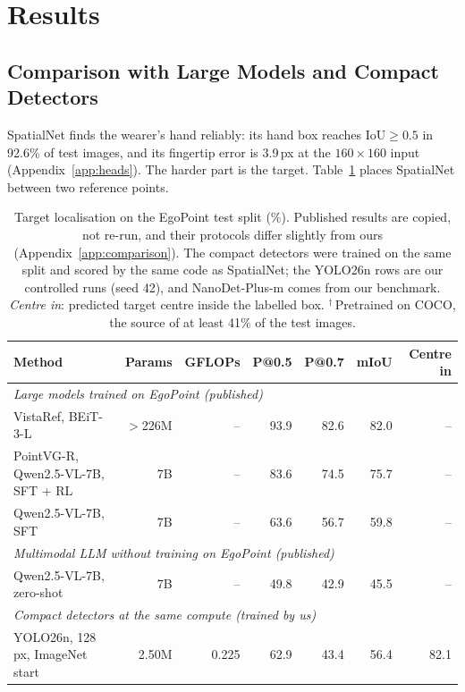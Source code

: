 \section{Results}\label{sec:results}

\subsection{Comparison with Large Models and Compact Detectors}\label{sec:comparison}

SpatialNet finds the wearer's hand reliably: its hand box reaches IoU${\geq}0.5$ in 92.6\% of test images, and its fingertip error is 3.9\,px at the $160\times160$ input (Appendix~\ref{app:heads}). The harder part is the target. Table~\ref{tab:main} places SpatialNet between two reference points.

\begin{table}[t]
  \caption{Target localisation on the EgoPoint test split (\%). Published results are copied, not re-run, and their protocols differ slightly from ours (Appendix~\ref{app:comparison}). The compact detectors were trained on the same split and scored by the same code as SpatialNet; the YOLO26n rows are our controlled runs (seed 42), and NanoDet-Plus-m comes from our benchmark. \emph{Centre in}: predicted target centre inside the labelled box. $^\dagger$\,Pretrained on COCO, the source of at least 41\% of the test images.}
  \label{tab:main}
  \footnotesize
  \setlength{\tabcolsep}{3.5pt}
  \begin{tabular}{lrrrrrr}
    \toprule
    Method & Params & GFLOPs & P@0.5 & P@0.7 & mIoU & Centre in \\
    \midrule
    \multicolumn{7}{l}{\emph{Large models trained on EgoPoint (published)}} \\
    \quad VistaRef, BEiT-3-L & $>$226M & -- & 93.9 & 82.6 & 82.0 & -- \\
    \quad PointVG-R, Qwen2.5-VL-7B, SFT + RL & 7B & -- & 83.6 & 74.5 & 75.7 & -- \\
    \quad Qwen2.5-VL-7B, SFT & 7B & -- & 63.6 & 56.7 & 59.8 & -- \\
    \multicolumn{7}{l}{\emph{Multimodal LLM without training on EgoPoint (published)}} \\
    \quad Qwen2.5-VL-7B, zero-shot & 7B & -- & 49.8 & 42.9 & 45.5 & -- \\
    \multicolumn{7}{l}{\emph{Compact detectors at the same compute (trained by us)}} \\
    \quad YOLO26n, 128\,px, ImageNet start & 2.50M & 0.225 & 62.9 & 43.4 & 56.4 & 82.1 \\

\end{tabular}
\end{table}
